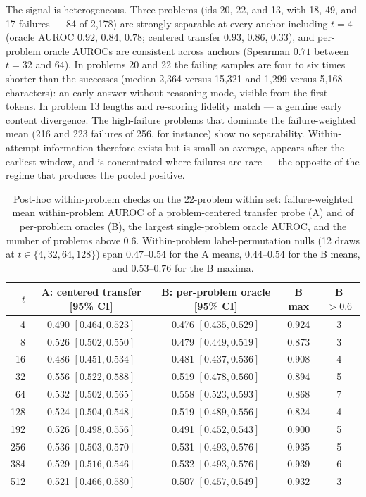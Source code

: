 The signal is heterogeneous. Three problems (ids 20, 22, and 13, with 18,
49, and 17 failures --- 84 of 2{,}178) are strongly separable at every
anchor including $t{=}4$ (oracle AUROC $0.92$, $0.84$, $0.78$; centered
transfer $0.93$, $0.86$, $0.33$), and per-problem oracle AUROCs are
consistent across anchors (Spearman $0.71$ between $t{=}32$ and $64$). In
problems 20 and 22 the failing samples are four to six times shorter than
the successes (median 2{,}364 versus 15{,}321 and 1{,}299 versus 5{,}168
characters): an early answer-without-reasoning mode, visible from the
first tokens. In problem 13 lengths and re-scoring fidelity match --- a
genuine early content divergence. The high-failure problems that dominate
the failure-weighted mean (216 and 223 failures of 256, for instance)
show no separability. Within-attempt information therefore exists but is
small on average, appears after the earliest window, and is concentrated
where failures are rare --- the opposite of the regime that produces the
pooled positive.

\begin{table}[h]\centering\small
\begin{tabular}{rcccc}
\toprule
$t$ & A: centered transfer [95\% CI] & B: per-problem oracle [95\% CI] & B max & B $>0.6$ \\
\midrule
4   & 0.490 $[0.464{,} 0.523]$ & 0.476 $[0.435{,} 0.529]$ & 0.924 & 3 \\
8   & 0.526 $[0.502{,} 0.550]$ & 0.479 $[0.449{,} 0.519]$ & 0.873 & 3 \\
16  & 0.486 $[0.451{,} 0.534]$ & 0.481 $[0.437{,} 0.536]$ & 0.908 & 4 \\
32  & 0.556 $[0.522{,} 0.588]$ & 0.519 $[0.478{,} 0.560]$ & 0.894 & 5 \\
64  & 0.532 $[0.502{,} 0.565]$ & 0.558 $[0.523{,} 0.593]$ & 0.868 & 7 \\
128 & 0.524 $[0.504{,} 0.548]$ & 0.519 $[0.489{,} 0.556]$ & 0.824 & 4 \\
192 & 0.526 $[0.498{,} 0.556]$ & 0.491 $[0.452{,} 0.543]$ & 0.900 & 5 \\
256 & 0.536 $[0.503{,} 0.570]$ & 0.531 $[0.493{,} 0.576]$ & 0.935 & 5 \\
384 & 0.529 $[0.516{,} 0.546]$ & 0.532 $[0.493{,} 0.576]$ & 0.939 & 6 \\
512 & 0.521 $[0.466{,} 0.580]$ & 0.507 $[0.457{,} 0.549]$ & 0.932 & 3 \\
\bottomrule
\end{tabular}
\caption{Post-hoc within-problem checks on the 22-problem within set:
failure-weighted mean within-problem AUROC of a problem-centered transfer
probe (A) and of per-problem oracles (B), the largest single-problem
oracle AUROC, and the number of problems above 0.6. Within-problem
label-permutation nulls (12 draws at $t \in \{4, 32, 64, 128\}$) span
$0.47$--$0.54$ for the A means, $0.44$--$0.54$ for the B means, and
$0.53$--$0.76$ for the B maxima.}
\label{tab:withinrobust}\end{table}

